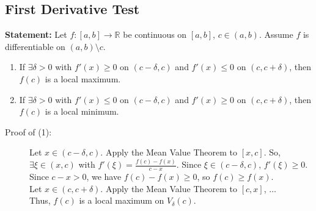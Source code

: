 \documentclass[10pt]{extarticle}
\newcommand{\R}{\mathbb{R}}
\begin{document}
  \subsection{First Derivative Test}%
  \textbf{Statement:} Let $f: [a,b]\rightarrow \R$ be continuous on $[a,b]$, $c\in (a,b)$. Assume $f$ is differentiable on $(a,b) \setminus c$.
  \begin{enumerate}[(1)]
    \item If $\exists \delta>0$ with $f'(x) \geq 0$ on $(c-\delta,c)$ and $f'(x) \leq 0$ on $(c,c+\delta)$, then $f(c)$ is a local maximum.
    \item If $\exists \delta>0$ with $f'(x) \leq 0$ on $(c-\delta,c)$ and $f'(x) \geq 0$ on $(c,c+\delta)$, then $f(c)$ is a local minimum.
  \end{enumerate}
  \begin{description}
    \item[Proof of (1):] Let $x\in (c-\delta,c)$. Apply the Mean Value Theorem to $[x,c]$. So, $\exists \xi\in(x,c)$ with $f'(\xi) = \frac{f(c)-f(x)}{c-x}$. Since $\xi\in (c-\delta,c)$, $f'(\xi) \geq 0$.\\

      Since $c-x > 0$, we have $f(c)-f(x) \geq 0$, so $f(c) \geq f(x)$.\\

      Let $x\in (c,c+\delta)$. Apply the Mean Value Theorem to $[c,x]$, $\dots$\\

      Thus, $f(c)$ is a local maximum on $V_{\delta}(c)$.
  \end{description}
\end{document}
